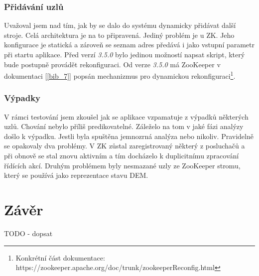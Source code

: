 \documentclass[
  digital, %
  table,   %
  nolof,     %
  nolot,     %
  oneside, %
  nocover,
  monochrome,
  12pt
]{fithesis3}
\begin{document}
\subsection*{Přidávání uzlů}
Uvažoval jsem nad tím, jak by se dalo do systému dynamicky přidávat další stroje. Celá architektura je na to připravená. Jediný problém je u ZK. Jeho konfigurace je statická a zároveň se seznam adres předává i jako vstupní parametr při startu aplikace. Před verzí \textit{3.5.0} bylo jedinou možností napsat skript, který bude postupně provádět rekonfiguraci. Od verze \textit{3.5.0} má ZooKeeper v dokumentaci [\ref{bib_7}] popsán mechanizmus pro dynamickou rekonfiguraci\footnote{Konkrétní část dokumentace: \\
https://zookeeper.apache.org/doc/trunk/zookeeperReconfig.html}.

\subsection*{Výpadky}
V rámci testování jsem zkoušel jak se aplikace vzpamatuje z výpadků některých uzlů. Chování nebylo příliš predikovatelné. Záleželo na tom v jaké fázi analýzy došlo k výpadku. Jestli byla spuštěna jemnozrná analýza nebo nikoliv. Pravidelně se opakovaly dva problémy. V ZK zůstal zaregistrovaný některý z posluchačů a při obnově se stal znovu aktivním a tím docházelo k duplicitnímu zpracování řídících akcí. Druhým problémem byly nesmazané uzly ze ZooKeeper stromu, který se používá jako reprezentace stavu DEM.

\chapter{Závěr}
TODO - dopsat

\end{document}
